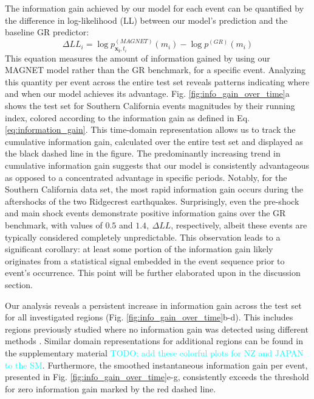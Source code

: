\documentclass[pdflatex]{sn-jnl}
\newcommand{\neri}[1]{{\textcolor{cyan}{#1}}}
\begin{document}
The information gain achieved by our model for each event can be quantified by the difference in log-likelihood (LL) between our model's prediction and the baseline GR predictor:
\begin{equation}
    \Delta LL_i = \log{p_{\pmb{x_i}, t_i}^{(MAGNET)}(m_i)} - \log{p^{(GR)}(m_i)}
    \label{eq:information_gain}
\end{equation}
This equation measures the amount of information gained by using our MAGNET model rather than the GR benchmark, for a specific event. Analyzing this quantity per event across the entire test set reveals patterns indicating where and when our model achieves its advantage. Fig. \ref{fig:info_gain_over_time}a shows the test set for Southern California events magnitudes by their running index, colored according to the information gain as defined in Eq. \ref{eq:information_gain}. This time-domain representation allows us to track the cumulative information gain, calculated over the entire test set and displayed as the black dashed line in the figure. The predominantly increasing trend in cumulative information gain suggests that our model is consistently advantageous as opposed to a concentrated advantage in specific periods. Notably, for the Southern California data set, the most rapid information gain occurs during the aftershocks of the two Ridgecrest earthquakes. Surprisingly, even the pre-shock and main shock events demonstrate positive information gains over the GR benchmark, with values of $0.5$ and $1.4, \ \Delta LL$, respectively, albeit these events are typically considered completely unpredictable. This observation leads to a significant corollary: at least some portion of the information gain likely originates from a statistical signal embedded in the event sequence prior to event's occurrence. This point will be further elaborated upon in the discussion section.
\newline

Our analysis reveals a persistent increase in information gain across the test set for all investigated regions (Fig. \ref{fig:info_gain_over_time}b-d). This includes regions previously studied where no information gain was detected using different methods  \cite{ogata_exploring_2018}. Similar domain representations for additional regions can be found in the supplementary material  \neri{TODO: add these colorful plots for NZ and JAPAN to the SM}. Furthermore, the smoothed instantaneous information gain per event, presented in Fig. \ref{fig:info_gain_over_time}e-g, consistently exceeds the threshold for zero information gain marked by the red dashed line.
\end{document}

